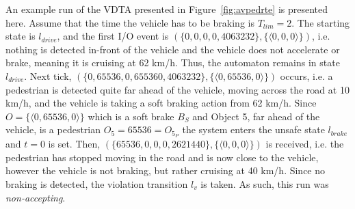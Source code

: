 

\begin{example}
	\label{ex:run}
	An example run of the VDTA presented in Figure~\ref{fig:avpedrte} is presented here.
	Assume that the time the vehicle has to be braking is $T_{lim} = 2$. 
	The starting state is $l_{drive}$, and the first I/O event is $(\{0, 0, 0, 0, 4063232\}, \{\langle 0, 0, 0 \rangle\})$, i.e. nothing is detected in-front of the vehicle and the vehicle does not accelerate or brake, meaning it is cruising at 62 km/h.
	Thus, the automaton remains in state $l_{drive}$.
	Next tick, $(\{0, 65536, 0, 655360, 4063232\}, \{\langle 0, 65536, 0 \rangle\})$ occurs, i.e. a pedestrian is detected quite far ahead of the vehicle, moving across the road at 10 km/h, and the vehicle is taking a soft braking action from 62 km/h.
	Since ${O} = \{\langle 0, 65536, 0 \rangle\}$ which is a soft brake $B_S$ and Object 5, far ahead of the vehicle, is a pedestrian $O_5 = 65536 = O_{5_P}$ the system enters the unsafe state $l_{brake}$ and $t = 0$ is set.
	Then,  $(\{65536, 0, 0, 0, 2621440\}, \{\langle 0, 0, 0 \rangle\})$ is received, i.e. the pedestrian has stopped moving in the road and is now close to the vehicle, however the vehicle is not braking, but rather cruising at 40 km/h.
	Since no braking is detected, the violation transition $l_v$ is taken.
	As such, this run was \textit{non-accepting}.
\end{example}

